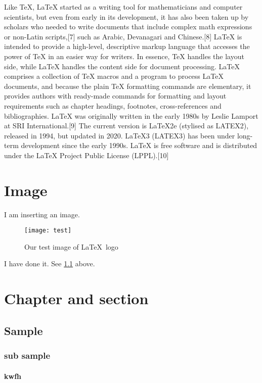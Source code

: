 \documentclass[a4,12pt]{report}
\begin{document}
	Like TeX, LaTeX started as a writing tool for mathematicians and computer scientists, but even from early in its development, it has also been taken up by scholars who needed to write documents that include complex math expressions or non-Latin scripts,[7] such as Arabic, Devanagari and Chinese.[8]
LaTeX is intended to provide a high-level, descriptive markup language that accesses the power of TeX in an easier way for writers. In essence, TeX handles the layout side, while LaTeX handles the content side for document processing. LaTeX comprises a collection of TeX macros and a program to process LaTeX documents, and because the plain TeX formatting commands are elementary, it provides authors with ready-made commands for formatting and layout requirements such as chapter headings, footnotes, cross-references and bibliographies.
LaTeX was originally written in the early 1980s by Leslie Lamport at SRI International.[9] The current version is LaTeX2e (stylised as LATEX2), released in 1994, but updated in 2020. LaTeX3 (LATEX3) has been under long-term development since the early 1990s. LaTeX is free software and is distributed under the LaTeX Project Public License (LPPL).[10]


	\chapter{Image}
	I am inserting an image.\\
	
	\begin{figure}[!h]
		\begin{center}
			\texttt{[image: test]}
			\caption{Our test image of \LaTeX \ logo}
			\label{fig:logo}
		\end{center}
	\end{figure}
	\noindent I have done it. See \ref{fig:logo} above.
	\chapter{Chapter and section}
		\section{Sample}
			\subsection{sub sample}
				\subsubsection{kwfh}
\end{document}

